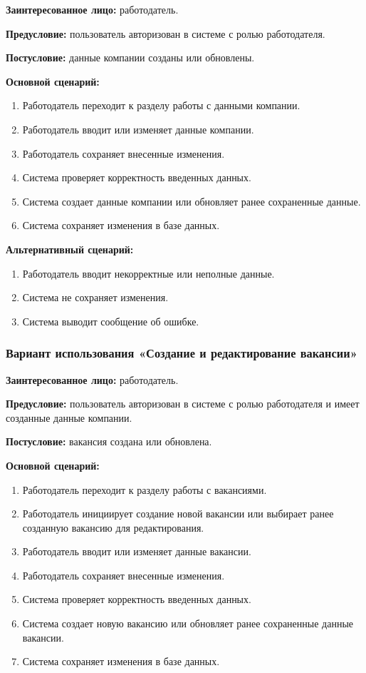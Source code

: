 \textbf{Заинтересованное лицо:} работодатель.

\textbf{Предусловие:} пользователь авторизован в системе с ролью работодателя.

\textbf{Постусловие:} данные компании созданы или обновлены.

\textbf{Основной сценарий:}
\begin{enumerate}
	\item Работодатель переходит к разделу работы с данными компании.
	\item Работодатель вводит или изменяет данные компании.
	\item Работодатель сохраняет внесенные изменения.
	\item Система проверяет корректность введенных данных.
	\item Система создает данные компании или обновляет ранее сохраненные данные.
	\item Система сохраняет изменения в базе данных.
\end{enumerate}

\textbf{Альтернативный сценарий:}
\begin{enumerate}
	\item Работодатель вводит некорректные или неполные данные.
	\item Система не сохраняет изменения.
	\item Система выводит сообщение об ошибке.
\end{enumerate}

\subsubsection{Вариант использования «Создание и редактирование вакансии»}

\textbf{Заинтересованное лицо:} работодатель.

\textbf{Предусловие:} пользователь авторизован в системе с ролью работодателя и имеет созданные данные компании.

\textbf{Постусловие:} вакансия создана или обновлена.

\textbf{Основной сценарий:}
\begin{enumerate}
	\item Работодатель переходит к разделу работы с вакансиями.
	\item Работодатель инициирует создание новой вакансии или выбирает ранее созданную вакансию для редактирования.
	\item Работодатель вводит или изменяет данные вакансии.
	\item Работодатель сохраняет внесенные изменения.
	\item Система проверяет корректность введенных данных.
	\item Система создает новую вакансию или обновляет ранее сохраненные данные вакансии.
	\item Система сохраняет изменения в базе данных.
\end{enumerate}

